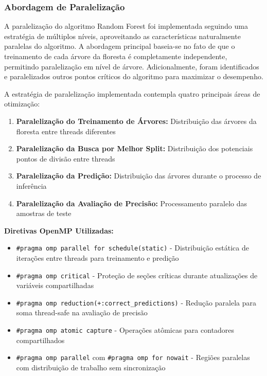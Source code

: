 \documentclass[a4paper,11pt]{article}
\begin{document}
\subsubsection{Abordagem de Paralelização}

A paralelização do algoritmo Random Forest foi implementada seguindo uma estratégia de múltiplos níveis, aproveitando as características naturalmente paralelas do algoritmo. A abordagem principal baseia-se no fato de que o treinamento de cada árvore da floresta é completamente independente, permitindo paralelização em nível de árvore. Adicionalmente, foram identificados e paralelizados outros pontos críticos do algoritmo para maximizar o desempenho.

A estratégia de paralelização implementada contempla quatro principais áreas de otimização:

\begin{enumerate}
    \item \textbf{Paralelização do Treinamento de Árvores:} Distribuição das árvores da floresta entre threads diferentes
    \item \textbf{Paralelização da Busca por Melhor Split:} Distribuição dos potenciais pontos de divisão entre threads
    \item \textbf{Paralelização da Predição:} Distribuição das árvores durante o processo de inferência
    \item \textbf{Paralelização da Avaliação de Precisão:} Processamento paralelo das amostras de teste
\end{enumerate}

\textbf{Diretivas OpenMP Utilizadas:}
\begin{itemize}
    \item \texttt{\#pragma omp parallel for schedule(static)} - Distribuição estática de iterações entre threads para treinamento e predição
    \item \texttt{\#pragma omp critical} - Proteção de seções críticas durante atualizações de variáveis compartilhadas
    \item \texttt{\#pragma omp reduction(+:correct\_predictions)} - Redução paralela para soma thread-safe na avaliação de precisão
    \item \texttt{\#pragma omp atomic capture} - Operações atômicas para contadores compartilhados
    \item \texttt{\#pragma omp parallel} com \texttt{\#pragma omp for nowait} - Regiões paralelas com distribuição de trabalho sem sincronização
\end{itemize}
\end{document}
